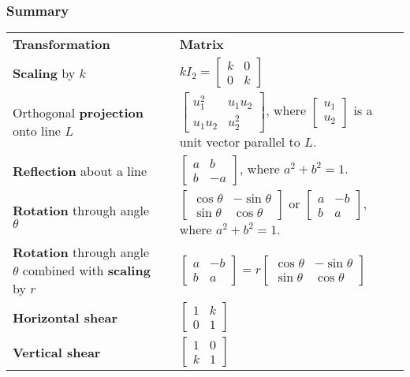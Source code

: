 \documentclass{report}
\begin{document}
\subsubsection*{Summary}
\begin{tabular}{lll}
\textbf{Transformation} & \qquad{} & \textbf{Matrix}\\
\textbf{Scaling} by $k$ & \qquad{} & $kI_{2}=\left[\begin{array}{cc}k&0\\ 0&k\end{array}\right]$\\
Orthogonal \textbf{projection} onto line $L$ & \qquad{} & $\left[\begin{array}{cc}u_{1}^{2}&u_{1}u_{2}\\ u_{1}u_{2}&u_{2}^{2}\end{array}\right]$, where $\left[\begin{array}{c}u_{1}\\ u_{2}\end{array}\right]$ is a unit vector parallel to $L$.\\
\textbf{Reflection} about a line & \qquad{} & $\left[\begin{array}{cc}a&b\\ b&-a\end{array}\right]$, where $a^{2}+b^{2}=1$.\\
\textbf{Rotation} through angle $\theta$ & \qquad{} & $\left[\begin{array}{cc}\cos\theta{}&-\sin\theta{}\\ \sin\theta{}&\cos\theta{}\end{array}\right]$ or $\left[\begin{array}{cc}a&-b\\ b&a\end{array}\right]$, where $a^{2}+b^{2}=1$.\\
\textbf{Rotation} through angle $\theta$ combined with \textbf{scaling} by $r$  & \qquad{} & $\left[\begin{array}{cc}a&-b\\ b&a\end{array}\right]=r\left[\begin{array}{cc}\cos\theta{}&-\sin\theta{}\\ \sin\theta{}&\cos\theta{}\end{array}\right]$\\
\textbf{Horizontal shear} & \qquad{} & $\left[\begin{array}{cc}1&k\\ 0&1\end{array}\right]$\\
\textbf{Vertical shear} & \qquad{} & $\left[\begin{array}{cc}1&0\\ k&1\end{array}\right]$\\
\end{tabular}
\pagebreak
\end{document}
